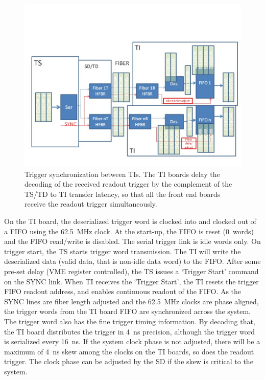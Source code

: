 \begin{figure}[hbt]
	\centering
	\includegraphics[width=1.0\columnwidth,keepaspectratio]{img/TrgSync.jpg}
	\caption{Trigger synchronization between TIs.  The TI boards delay the decoding of the received readout trigger by the complement of the TS/TD to TI transfer latency, so that all the front end boards receive the readout trigger simultaneously.}
	\label{fig:TIsync}
\end{figure}

On the TI board, the deserialized trigger word is clocked into and clocked out of a FIFO using the 62.5~MHz clock.  At the start-up, the FIFO is reset (0~words) and the FIFO read/write is disabled.  The serial trigger link is idle words only.  On trigger start, the TS starts trigger word transmission.  The TI will write the deserialized data (valid data, that is non-idle data word) to the FIFO.  After some pre-set delay (VME register controlled), the TS issues a ‘Trigger Start’ command on the SYNC link.  When TI receives the ‘Trigger Start’, the TI resets the trigger FIFO readout address, and enables continuous readout of the FIFO.  As the SYNC lines are fiber length adjusted and the 62.5~MHz clocks are phase aligned, the trigger words from the TI board FIFO are synchronized across the system.
The trigger word also has the fine trigger timing information.  By decoding that, the TI board distributes the trigger in 4~ns precision, although the trigger word is serialized every 16~ns.  If the system clock phase is not adjusted, there will be a maximum of 4~ns skew among the clocks on the TI boards, so does the readout trigger.  The clock phase can be adjusted by the SD if the skew is critical to the system.


